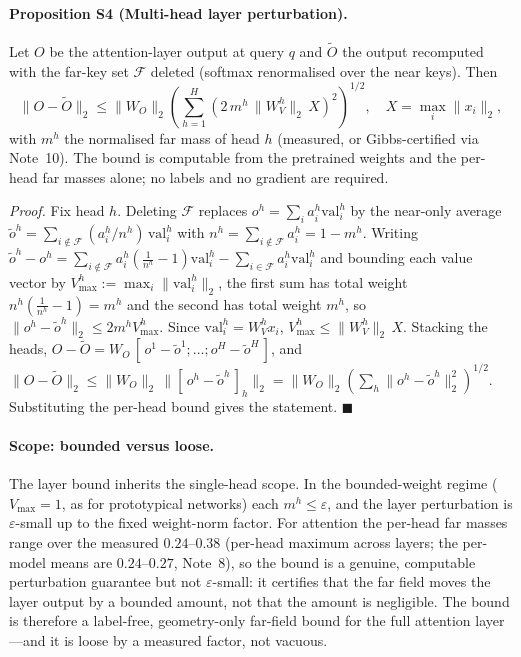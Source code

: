\documentclass[10pt,twocolumn]{article}
\begin{document}
\paragraph{Proposition S4 (Multi-head layer perturbation).} Let $O$ be the attention-layer output at query $q$ and $\tilde O$ the output recomputed with the far-key set $\mathcal{F}$ deleted (softmax renormalised over the near keys). Then
\begin{equation}
\|O-\tilde O\|_2 \le \|W_O\|_2 \left( \sum_{h=1}^{H} \left( 2\, m^h\, \|W_V^h\|_2\, X \right)^2 \right)^{1/2}, \quad X=\max_i \|x_i\|_2 ,
\end{equation}
with $m^h$ the normalised far mass of head $h$ (measured, or Gibbs-certified via Note~10). The bound is computable from the pretrained weights and the per-head far masses alone; no labels and no gradient are required.

\emph{Proof.} Fix head $h$. Deleting $\mathcal{F}$ replaces $o^h=\sum_i a^h_i\mathrm{val}^h_i$ by the near-only average $\tilde o^h=\sum_{i\notin\mathcal{F}}(a^h_i/n^h)\,\mathrm{val}^h_i$ with $n^h=\sum_{i\notin\mathcal{F}}a^h_i=1-m^h$. Writing $\tilde o^h-o^h=\sum_{i\notin\mathcal{F}}a^h_i(\tfrac1{n^h}-1)\mathrm{val}^h_i-\sum_{i\in\mathcal{F}}a^h_i\mathrm{val}^h_i$ and bounding each value vector by $V^h_{\max}:=\max_i\lVert\mathrm{val}^h_i\rVert_2$, the first sum has total weight $n^h(\tfrac1{n^h}-1)=m^h$ and the second has total weight $m^h$, so $\lVert o^h-\tilde o^h\rVert_2\le 2m^hV^h_{\max}$. Since $\mathrm{val}^h_i=W_V^h x_i$, $V^h_{\max}\le\lVert W_V^h\rVert_2\,X$. Stacking the heads, $O-\tilde O=W_O\,[\,o^1-\tilde o^1;\dots;o^H-\tilde o^H\,]$, and $\lVert O-\tilde O\rVert_2\le\lVert W_O\rVert_2\,\lVert[\,o^h-\tilde o^h\,]_h\rVert_2=\lVert W_O\rVert_2(\sum_h\lVert o^h-\tilde o^h\rVert_2^2)^{1/2}$. Substituting the per-head bound gives the statement. $\blacksquare$

\paragraph{Scope: bounded versus loose.} The layer bound inherits the single-head scope. In the bounded-weight regime ($V_{\max}=1$, as for prototypical networks) each $m^h\le\varepsilon$, and the layer perturbation is $\varepsilon$-small up to the fixed weight-norm factor. For attention the per-head far masses range over the measured $0.24$--$0.38$ (per-head maximum across layers; the per-model means are $0.24$--$0.27$, Note~8), so the bound is a genuine, computable perturbation guarantee but not $\varepsilon$-small: it certifies that the far field moves the layer output by a bounded amount, not that the amount is negligible. The bound is therefore a label-free, geometry-only far-field bound for the full attention layer---and it is loose by a measured factor, not vacuous.
\end{document}
